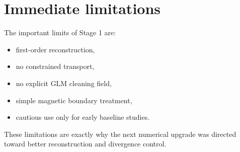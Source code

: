 \documentclass[11pt]{article}
\begin{document}
\section{Immediate limitations}
The important limits of Stage 1 are:
\begin{itemize}[leftmargin=1.8em]
    \item first-order reconstruction,
    \item no constrained transport,
    \item no explicit GLM cleaning field,
    \item simple magnetic boundary treatment,
    \item cautious use only for early baseline studies.
\end{itemize}
These limitations are exactly why the next numerical upgrade was directed toward better reconstruction and divergence control.
\end{document}
